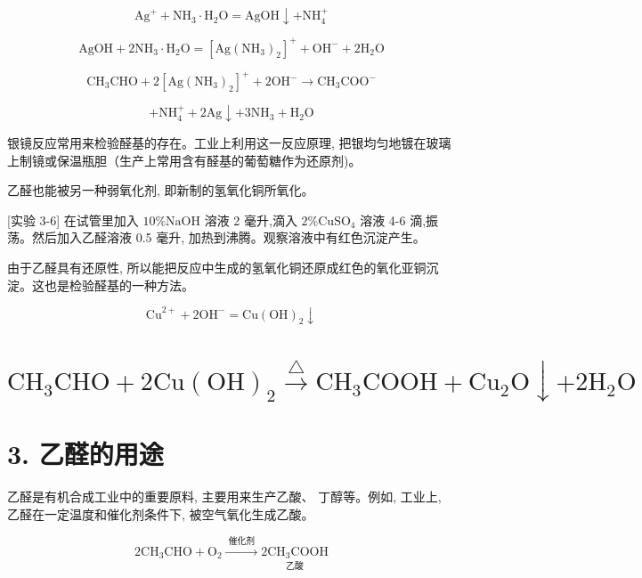 \documentclass[10pt]{article}
\begin{document}
\[
{\mathrm{{Ag}}}^{ + } + {\mathrm{{NH}}}_{3} \cdot {\mathrm{H}}_{2}\mathrm{O} = \mathrm{{AgOH}} \downarrow + {\mathrm{{NH}}}_{4}^{ + }
\]

\[
\mathrm{{AgOH}} + 2{\mathrm{{NH}}}_{3} \cdot {\mathrm{H}}_{2}\mathrm{O} = {\left\lbrack \mathrm{{Ag}}{\left( {\mathrm{{NH}}}_{3}\right) }_{2}\right\rbrack }^{ + } + {\mathrm{{OH}}}^{ - } + 2{\mathrm{H}}_{2}\mathrm{O}
\]

\[
{\mathrm{{CH}}}_{3}\mathrm{{CHO}} + 2{\left\lbrack \mathrm{{Ag}}{\left( {\mathrm{{NH}}}_{3}\right) }_{2}\right\rbrack }^{ + } + 2{\mathrm{{OH}}}^{ - } \rightarrow {\mathrm{{CH}}}_{3}{\mathrm{{COO}}}^{ - }
\]

\[
+ {\mathrm{{NH}}}_{4}^{ + } + 2\mathrm{{Ag}} \downarrow + 3{\mathrm{{NH}}}_{3} + {\mathrm{H}}_{2}\mathrm{O}
\]

银镜反应常用来检验醛基的存在。工业上利用这一反应原理, 把银均匀地镀在玻璃上制镜或保温瓶胆（生产上常用含有醛基的葡萄糖作为还原剂)。

乙醛也能被另一种弱氧化剂, 即新制的氢氧化铜所氧化。

[实验 3-6] 在试管里加入 \({10}\% \mathrm{{NaOH}}\) 溶液 2 毫升,滴入 \(2\% {\mathrm{{CuSO}}}_{4}\) 溶液 4-6 滴,振荡。然后加入乙醛溶液 0.5 毫升, 加热到沸腾。观察溶液中有红色沉淀产生。

由于乙醛具有还原性, 所以能把反应中生成的氢氧化铜还原成红色的氧化亚铜沉淀。这也是检验醛基的一种方法。

\[
{\mathrm{{Cu}}}^{2 + } + 2{\mathrm{{OH}}}^{ - } = \mathrm{{Cu}}{\left( \mathrm{{OH}}\right) }_{2} \downarrow
\]

\section*{\({\mathrm{{CH}}}_{3}\mathrm{{CHO}} + 2\mathrm{{Cu}}{\left( \mathrm{{OH}}\right) }_{2}\overset{\bigtriangleup }{ \rightarrow }{\mathrm{{CH}}}_{3}\mathrm{{COOH}} + {\mathrm{{Cu}}}_{2}\mathrm{O} \downarrow + 2{\mathrm{H}}_{2}\mathrm{O}\)}

\section*{3. 乙醛的用途}

乙醛是有机合成工业中的重要原料, 主要用来生产乙酸、 丁醇等。例如, 工业上, 乙醛在一定温度和催化剂条件下, 被空气氧化生成乙酸。

\[
2{\mathrm{{CH}}}_{3}\mathrm{{CHO}} + {\mathrm{O}}_{2}\xrightarrow[]{\text{ 催化剂 }}\underset{\text{ 乙酸 }}{2{\mathrm{{CH}}}_{3}\mathrm{{COOH}}}
\]
\end{document}
